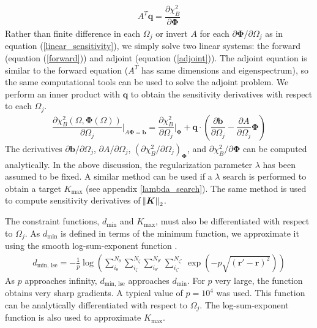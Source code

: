 \documentclass[aps,unsortedaddress]{revtex4-1}
\newcommand{\partder}[2]{\dfrac{\partial  #1}{\partial  #2}}
\begin{document}
\begin{gather}
A^T \bm{q} = \partder{\chi^2_B}{\bm{\Phi}}
\label{adjoint}
\end{gather}
Rather than finite difference in each $\Omega_j$ or invert $A$ for each $\partial \bm{\Phi}/\partial \Omega_j$ as in equation (\ref{linear_sensitivity}), we simply solve two linear systems: the forward (equation (\ref{forward})) and adjoint (equation (\ref{adjoint})). The adjoint equation is similar to the forward equation ($A^T$ has same dimensions and eigenspectrum), so the same computational tools can be used to solve the adjoint problem. We perform an inner product with $\bm{q}$ to obtain the sensitivity derivatives with respect to each $\Omega_j$. 
\begin{gather}
\partder{\chi^2_B(\Omega, \bm{\Phi}(\Omega))}{\Omega_j} \bigg \rvert_{A \bm{\Phi} = \bm{b}} = \partder{\chi^2_B}{\Omega_j} \bigg \rvert_{\bm{\Phi}} + \bm{q} \cdot \left( \partder{\bm{b}}{\Omega_j} - \partder{A}{\Omega_j} \bm{\Phi} \right)
\label{adjointsensitivity}
\end{gather}
The derivatives $\partial \bm{b}/\partial \Omega_j$, $\partial A/\partial \Omega_j$, $\left( \partial \chi^2_B/\partial \Omega_j \right)_{\bm{\Phi}}$, and $\partial \chi^2_B/\partial \bm{\Phi}$ can be computed analytically. In the above discussion, the regularization parameter $\lambda$ has been assumed to be fixed. A similar method can be used if a $\lambda$ search is performed to obtain a target $K_{\text{max}}$ (see appendix \ref{lambda_search}). The same method is used to compute sensitivity derivatives of $\norm{\bm{K}}_2$. 

The constraint functions, $d_{\text{min}}$ and $K_{\text{max}}$, must also be differentiated with respect to $\Omega_j$. As $d_{\text{min}}$ is defined in terms of the minimum function, we approximate it using the smooth log-sum-exponent function \cite{Boyd2004}.
\begin{gather}
d_{\text{min, lse}} = - \frac{1}{p} \log \left( \sum_{i_{\theta}}^{N_{\theta}} \sum_{i_{\zeta}}^{N_{\zeta}} \sum_{i_{\theta'}}^{N_{\theta'}} \sum_{i_{\zeta'}}^{N_{\zeta'}} \, \exp \left( - p \sqrt{(\bm{r}' - \bm{r})^2} \right) \right)
\label{lse_d}
\end{gather}
As $p$ approaches infinity, $d_{\text{min, lse}}$ approaches $d_{\text{min}}$. For $p$ very large, the function obtains very sharp gradients. A typical value of $p = 10^4$ was used. This function can be analytically differentiated with respect to $\Omega_j$. The log-sum-exponent function is also used to approximate $K_{\text{max}}$. 
\end{document}
